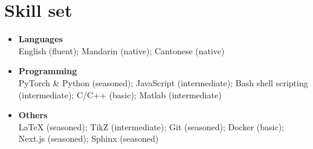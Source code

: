\documentclass[letterpaper,11pt]{article}
\begin{document}
    \section{Skill set}

    \begin{itemize}[leftmargin=0.15in, label={}, itemsep=0em]
        \item \textbf{Languages}\\
        English (fluent); Mandarin (native); Cantonese (native)
        \item \textbf{Programming}\\
        PyTorch \& Python (seasoned); JavaScript (intermediate); Bash shell scripting (intermediate); C/C++ (basic); Matlab (intermediate)
        \item \textbf{Others}\\
        LaTeX (seasoned); TikZ (intermediate); Git (seasoned); Docker (basic); Next.js (seasoned); Sphinx (seasoned)
    \end{itemize}
\end{document}
